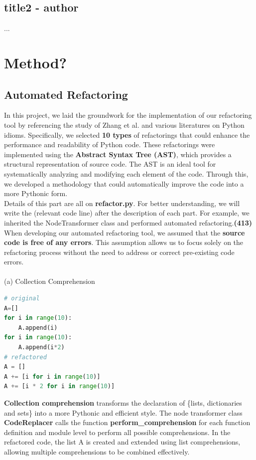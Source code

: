\documentclass[11pt]{article}
\begin{document}
\subsection{title2 - author}
...\\

\section{Method?}
\subsection{Automated Refactoring}
In this project, we laid the groundwork for the implementation of our refactoring tool by referencing the study of Zhang et al. and various literatures on Python idioms. Specifically, we selected \textbf{10 types} of refactorings that could enhance the performance and readability of Python code. These refactorings were implemented using the \textbf{Abstract Syntax Tree (AST)}, which provides a structural representation of source code. The AST is an ideal tool for systematically analyzing and modifying each element of the code. Through this, we developed a methodology that could automatically improve the code into a more Pythonic form.\\
Details of this part are all on \textbf{refactor.py}. For better understanding, we will write the (relevant code line) after the description of each part. For example, we inherited the NodeTransformer class and performed automated refactoring.\textbf{(413)}\\
When developing our automated refactoring tool, we assumed that the \textbf{source code is free of any errors}. This assumption allows us to focus solely on the refactoring process without the need to address or correct pre-existing code errors.\\ \\
(a) Collection Comprehension
\begin{lstlisting}[language=python]
# original
A=[]
for i in range(10):
    A.append(i)
for i in range(10):
    A.append(i*2)
# refactored
A = []
A += [i for i in range(10)]
A += [i * 2 for i in range(10)]
\end{lstlisting}
\textbf{Collection comprehension} transforms the declaration of \{lists, dictionaries and sets\} into a more Pythonic and efficient style. The node transformer class \textbf{CodeReplacer} calls the function \textbf{perform\_comprehension} for each function definition and module level to perform all possible comprehensions. In the refactored code, the list A is created and extended using list comprehensions, allowing multiple comprehensions to be combined effectively.
\end{document}
